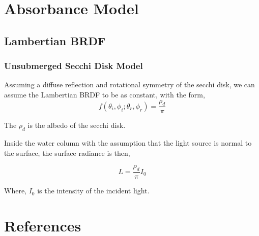 \documentclass{article}
\begin{document}
\section{Absorbance Model}
\subsection{Lambertian BRDF}
\subsubsection{Unsubmerged Secchi Disk Model}

Assuming a diffuse reflection and rotational symmetry of the
secchi disk, we can assume the Lambertian BRDF to be
as constant, with the form,
\[
f(\theta_i, \phi_i; \theta_r , \phi_r) = \frac{\rho_d}{\pi}
\]

The $\rho_d$ is the albedo of the secchi disk.

Inside the water column with the assumption that the light source is normal to the surface,
the surface radiance is then,

\[
L = \frac{\rho_d}{\pi} I_0
\]

Where, $I_0$ is the intensity of the incident light.


\section{References}

\begin{thebibliography}{9}
\end{thebibliography}
\end{document}
